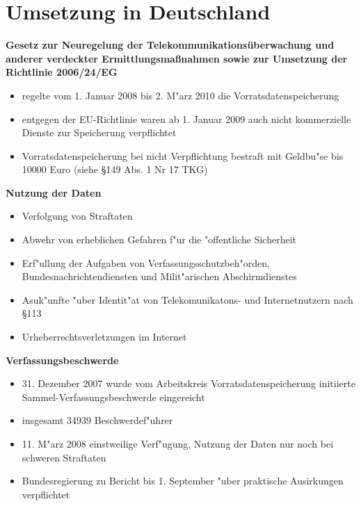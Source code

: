 
\section{Umsetzung in Deutschland}
  \begin{frame}
  \textbf{Gesetz zur Neuregelung der Telekommunikationsüberwachung und anderer verdeckter Ermittlungsmaßnahmen sowie zur Umsetzung der Richtlinie 2006/24/EG}
    \begin{itemize}
      \item 
        regelte vom 1. Januar 2008 bis 2. M"arz 2010 die Vorratsdatenspeicherung
      \item 
        entgegen der EU-Richtlinie waren ab 1. Januar 2009 auch nicht kommerzielle Dienste zur Speicherung verpflichtet
      \item 
        Vorratsdatenspeicherung bei nicht Verpflichtung bestraft mit Geldbu"se bis 10000 Euro (siehe \S 149 Abs. 1 Nr 17 TKG)
    \end{itemize}
  \end{frame}

  \begin{frame}
    \textbf{Nutzung der Daten}
    \begin{itemize}
      \item Verfolgung von Straftaten
      \item Abwehr von erheblichen Gefahren f"ur die "offentliche Sicherheit
      \item Erf"ullung der Aufgaben von Verfassungsschutzbeh"orden, Bundesnachrichtendiensten und Milit"arischen Abschirmdienstes
      \item Asuk"unfte "uber Identit"at von Telekomunikatons- und Internetnutzern nach \S 113
      \item Urheberrechtsverletzungen im Internet
    \end{itemize}
  \end{frame}

  \begin{frame}
    \textbf{Verfassungsbeschwerde}
    \begin{itemize}
      \item 31. Dezember 2007 wurde vom Arbeitskreis Vorratsdatenspeicherung initiierte Sammel-Verfassungsbeschwerde eingereicht
      \item insgesamt 34939 Beschwerdef"uhrer
      \item 11. M"arz 2008 einstweilige Verf"ugung, Nutzung der Daten nur noch bei schweren Straftaten
      \item Bundesregierung zu Bericht bis 1. September "uber praktische Ausirkungen verpflichtet
    \end{itemize}
  \end{frame}

